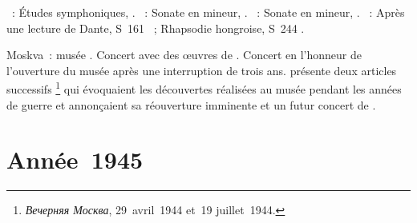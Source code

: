 \begin{description}
 \textsc{\Schumann{}}~: Études symphoniques, .
 \textsc{\Chopin{}}~: Sonate en \kB \Flat mineur, .
 \textsc{\Beethoven{}}~: Sonate en \kC \Sharp mineur,  .
 \textsc{\Liszt{}}~: Après une lecture de Dante, S~161 ~;
 Rhapsodie hongroise, S~244 .
 \item[\DateWithWeekDay{1944-12-18}]
 Moskva~: musée \Scriabine{}.
 Concert avec des œuvres de \Scriabine{}.
 Concert en l'honneur de l'ouverture du musée après une interruption de
 trois ans.
 \citet{Lazarev20} présente deux articles successifs%
 \footnote{\foreignlanguage{russian}{\emph{Вечерняя Москва}}, 29~avril~1944
 et~19 juillet~1944.}
 qui évoquaient les découvertes réalisées au musée \Scriabine{} pendant les
 années de guerre et annonçaient sa réouverture imminente et un futur
 concert de \VSofronitsky{}.
\end{description}

\section{Année~1945}

